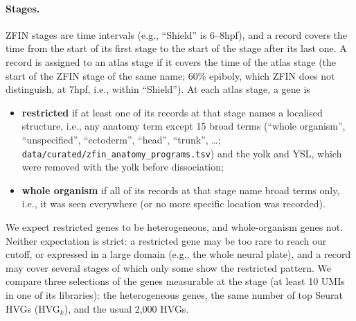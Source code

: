 \documentclass[11pt,a4paper]{article}
\begin{document}
\paragraph{Stages.} ZFIN stages are time intervals (e.g., ``Shield'' is 6--8hpf), and a record covers the time from the start of its first stage to the start of the stage after its last one. A record is assigned to an atlas stage if it covers the time of the atlas stage (the start of the ZFIN stage of the same name; 60\% epiboly, which ZFIN does not distinguish, at 7hpf, i.e., within ``Shield''). At each atlas stage, a gene is
\begin{itemize}
	\item \textbf{restricted} if at least one of its records at that stage names a localised structure, i.e., any anatomy term except 15 broad terms (``whole organism'', ``unspecified'', ``ectoderm'', ``head'', ``trunk'', \ldots; \nolinkurl{data/curated/zfin_anatomy_programs.tsv}) and the yolk and YSL, which were removed with the yolk before dissociation;
	\item \textbf{whole organism} if all of its records at that stage name broad terms only, i.e., it was seen everywhere (or no more specific location was recorded).
\end{itemize}
We expect restricted genes to be heterogeneous, and whole-organism genes not. Neither expectation is strict: a restricted gene may be too rare to reach our cutoff, or expressed in a large domain (e.g., the whole neural plate), and a record may cover several stages of which only some show the restricted pattern. We compare three selections of the genes measurable at the stage (at least 10 UMIs in one of its libraries): the heterogeneous genes, the same number of top Seurat HVGs (HVG$_k$), and the usual 2{,}000 HVGs.
\end{document}
